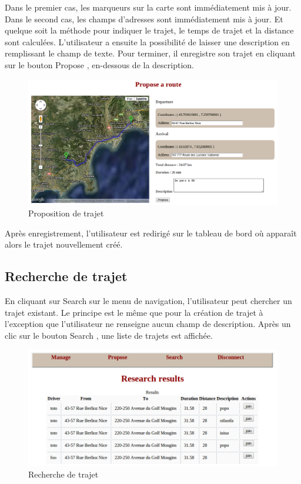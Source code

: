 \documentclass[a4paper]{article}
\begin{document}
Dans le premier cas, les marqueurs sur la carte sont immédiatement mis à jour.
Dans le second cas, les champs d'adresses sont immédiatement mis à jour.
Et quelque soit la méthode pour indiquer le trajet, le temps de trajet
et la distance sont calculées. L'utilisateur a ensuite la possibilité de
laisser une description en remplissant le champ de texte.
Pour terminer, il enregistre son trajet en cliquant sur le bouton
\og Propose \fg, en-dessous de la description.

\begin{figure}[!ht]
	\centering
	\includegraphics[scale=0.4]{Propose.png}
	\caption{\label{propose} Proposition de trajet}
\end{figure}

Après enregistrement, l'utilisateur est redirigé sur le tableau de
bord où apparaît alors le trajet nouvellement créé.

\subsection{Recherche de trajet}

En cliquant sur \og Search \fg sur le menu de navigation, l'utilisateur
peut chercher un trajet existant. Le principe est le même que pour la création
de trajet à l'exception que l'utilisateur ne renseigne aucun champ de description.
Après un clic sur le bouton \og Search \fg, une liste de trajets est affichée. 

\begin{figure}[!ht]
	\centering
	\includegraphics[scale=0.5]{Search.png}
	\caption{\label{search} Recherche de trajet}
\end{figure}
\newpage
\end{document}
